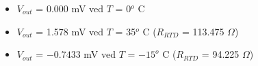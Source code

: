 





\begin{itemize}
\item{} $V_{out}$ = 0.000 mV ved $T$ = 0$^{o}$ C
\vskip 5pt
\item{} $V_{out}$ = 1.578 mV ved $T$ = 35$^{o}$ C  ($R_{RTD}$ = 113.475 $\Omega$)
\vskip 5pt
\item{} $V_{out}$ = $-0.7433$ mV ved $T$ = $-15^{o}$ C  ($R_{RTD}$ = 94.225 $\Omega$)
\end{itemize}



